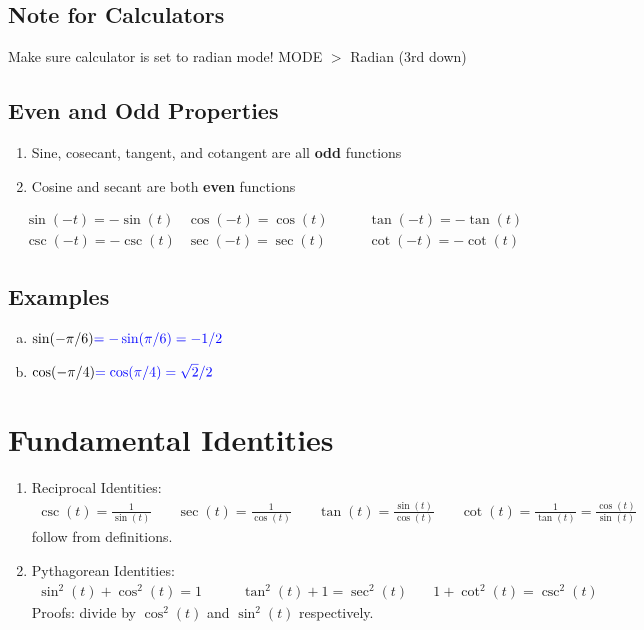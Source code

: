 \documentclass{tufte-handout}
\begin{document}
\subsection{Note for Calculators}
{\color{red} Make sure calculator is set to radian mode!}
MODE $>$ Radian (3rd down) 

\subsection{Even and Odd Properties}
\begin{enumerate}
\item Sine, cosecant, tangent, and cotangent are all \textbf{odd} functions
\item Cosine and secant are both \textbf{even} functions
\end{enumerate}
\begin{align*}
&\sin(-t) = -\sin(t) &\cos(-t) = \cos(t) &\qquad\tan(-t) = -\tan(t) \\
&\csc(-t) = -\csc(t) &\sec(-t) = \sec(t) &\qquad\cot(-t) = -\cot(t) 
\end{align*}

\subsection{Examples}
\begin{enumerate}[(a)]
\item $\sin(-\pi/6) {\color{blue} = -\sin(\pi/6) = -1/2}$ \\
\item $\cos(-\pi/4) {\color{blue} = \cos(\pi/4) = \sqrt{2}/2}$
\end{enumerate}

\section{Fundamental Identities}
\begin{enumerate}
\item Reciprocal Identities:
\begin{align*}
\csc(t) = \frac{1}{\sin(t)} &\quad\sec(t) = \frac{1}{\cos(t)} &\quad\tan(t) = \frac{\sin(t)}{\cos(t)} &\quad\cot(t) = \frac{1}{\tan(t)} = \frac{\cos(t)}{\sin(t)}
\end{align*}
follow from definitions.
\item Pythagorean Identities:
\begin{align*}
\sin^2(t) + \cos^2(t) = 1 &\qquad\tan^2(t) + 1 = \sec^2(t) &\quad 1 + \cot^2(t) = \csc^2(t)
\end{align*}
Proofs: divide by $\cos^2(t)$ and $\sin^2(t)$ respectively. 
\end{enumerate}
\end{document}
